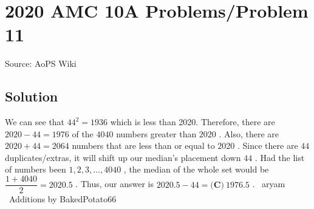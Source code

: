 \documentclass[12pt]{article}
\begin{document}
\section*{{2020 AMC 10A Problems/Problem 11}}
Source: AoPS Wiki

\subsection*{Solution}
We can see that $44^2=1936$ which is less than 2020. Therefore, there are $2020-44=1976$ of the $4040$ numbers greater than $2020$ . Also, there are $2020+44=2064$ numbers that are less than or equal to $2020$ . Since there are $44$ duplicates/extras, it will shift up our median's placement down $44$ . Had the list of numbers been $1,2,3, \dots, 4040$ , the median of the whole set would be $\dfrac{1+4040}{2}=2020.5$ . Thus, our answer is $2020.5-44=\boxed{\textbf{(C)}\ 1976.5}$ . ~aryam ~Additions by BakedPotato66
\end{document}

